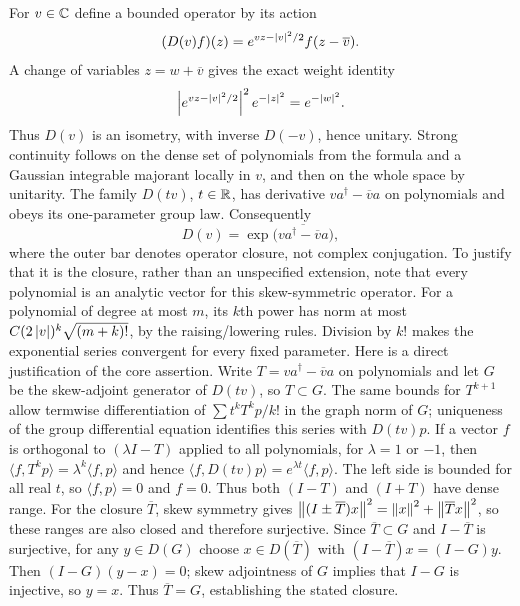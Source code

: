 For $v\in\mathbb C$ define a bounded operator by its action
\begin{equation}\label{eq:displacement-action}
 (D(v)f)(z)=e^{vz-\left\lvert v\right\rvert^2/2}f(z-\overline v).
\end{equation}
A change of variables $z=w+\overline v$ gives the exact weight identity
\begin{equation}
 \left\lvert e^{vz-\left\lvert v\right\rvert^2/2}\right\rvert^2e^{-\left\lvert z\right\rvert^2}=e^{-\left\lvert w\right\rvert^2}.
\end{equation}
Thus $D(v)$ is an isometry, with inverse $D(-v)$, hence unitary. Strong continuity follows on the dense set of polynomials from the formula and a Gaussian integrable majorant locally in $v$, and then on the whole space by unitarity. The family $D(tv)$, $t\in\mathbb R$, has derivative $v a^\dagger-\overline v a$ on polynomials and obeys its one-parameter group law. Consequently
\begin{equation}\label{eq:D-exponential}
 D(v)=\exp\bigl(\overline{v a^\dagger-\overline v a}\bigr),
\end{equation}
where the outer bar denotes operator closure, not complex conjugation.
To justify that it is the closure, rather than an unspecified extension, note that every polynomial is an analytic vector for this skew-symmetric operator. For a polynomial of degree at most $m$, its $k$th power has norm at most
$C(2\left\lvert v\right\rvert)^k\sqrt{(m+k)!}$, by the raising/lowering rules. Division by $k!$ makes the exponential series convergent for every fixed parameter. Here is a direct justification of the core assertion. Write $T=v a^\dagger-\overline v a$ on polynomials and let $G$ be the skew-adjoint generator of $D(tv)$, so $T\subset G$. The same bounds for $T^{k+1}$ allow termwise differentiation of $\sum t^kT^kp/k!$ in the graph norm of $G$; uniqueness of the group differential equation identifies this series with $D(tv)p$. If a vector $f$ is orthogonal to $(\lambda I-T)$ applied to all polynomials, for $\lambda=1$ or $-1$, then
$\langle f,T^kp\rangle=\lambda^k\langle f,p\rangle$ and hence
$\langle f,D(tv)p\rangle=e^{\lambda t}\langle f,p\rangle$.
The left side is bounded for all real $t$, so $\langle f,p\rangle=0$ and $f=0$. Thus both $(I-T)$ and $(I+T)$ have dense range. For the closure $\overline T$, skew symmetry gives
$\left\lVert (I\pm\overline T)x\right\rVert^2=\left\lVert x\right\rVert^2+\left\lVert \overline T x\right\rVert^2$,
so these ranges are also closed and therefore surjective. Since $\overline T\subset G$ and $I-\overline T$ is surjective, for any $y\in D(G)$ choose $x\in D(\overline T)$ with $(I-\overline T)x=(I-G)y$. Then $(I-G)(y-x)=0$; skew adjointness of $G$ implies that $I-G$ is injective, so $y=x$. Thus $\overline T=G$, establishing the stated closure.

